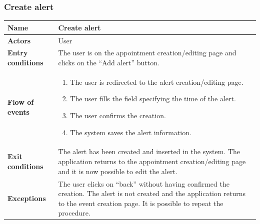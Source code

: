 \subsubsection{Create alert}
\begin{table}[!h]
	\centering
	{\renewcommand{\arraystretch}{2}%
		\begin{tabular}{|l|p{12cm}|}
			\hline
			\textbf{Name} 				& \textbf{Create alert} \\ \hline
			\textbf{Actors} 			& User \\ \hline
			\textbf{Entry conditions} 	& The user is on the appointment creation/editing page and clicks on the “Add alert” button. \\ \hline
			\textbf{Flow of events}		& \begin{minipage}[t]{0.75\textwidth}
				\begin{enumerate}
					\item The user is redirected to the alert creation/editing page.
					\item The user fills the field specifying the time of the alert.
					\item The user confirms the creation.
					\item The system saves the alert information.
				\end{enumerate}
			\end{minipage}	\\ \hline
			\textbf{Exit conditions}	&The alert has been created and inserted in the system. The application returns to the appointment creation/editing page and it is now possible to edit the alert. \\ \hline
			\textbf{Exceptions}			& The user clicks on “back” without having confirmed the creation. The alert is not created and the application returns to the event creation page. It is possible to repeat the procedure.  \\ \hline
	\end{tabular}}
\end{table}
\clearpage

